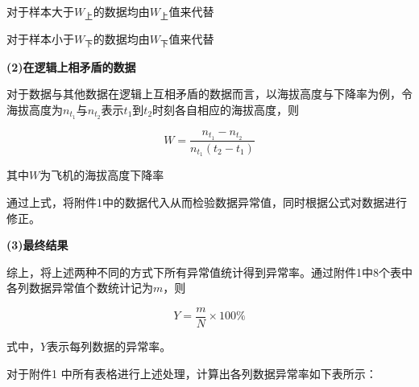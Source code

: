 \documentclass[UTF8]{ctexart}
\begin{document}
	对于样本大于$W_{\text{上}}$的数据均由$W_{\text{上}}$值来代替\par
	对于样本小于$W_{\text{下}}$的数据均由$W_{\text{下}}$值来代替 \par
	\textbf{(2)在逻辑上相矛盾的数据}\par
	对于数据与其他数据在逻辑上互相矛盾的数据而言，以海拔高度与下降率为例，令海拔高度为$n_{t_1}$与$n_{t_2}$表示$t_1$到$t_2$时刻各自相应的海拔高度，则 \par
	\begin{equation}
		W=\frac{n_{t_1}-n_{t_2}}{n_{t_1}\left( t_2-t_1 \right)}
	\end{equation}\par
	其中$W$为飞机的海拔高度下降率 \par
	通过上式，将附件1中的数据代入从而检验数据异常值，同时根据公式对数据进行修正。\par
	\textbf{(3)最终结果}\par
	综上，将上述两种不同的方式下所有异常值统计得到异常率。通过附件1中8个表中各列数据异常值个数统计记为$m$，则\par
	\begin{equation}
		Y=\frac{m}{N}\times 100\%
	\end{equation}\par
	式中，$Y$表示每列数据的异常率。 \par
	对于附件1 中所有表格进行上述处理，计算出各列数据异常率如下表所示：  \par
\end{document}
